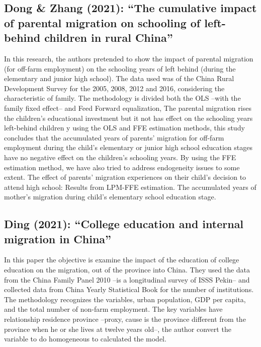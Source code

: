 \documentclass[11pt]{article}
\theoremstyle{prop}
\begin{document}
	\subsection{Dong \& Zhang (2021): ``The cumulative impact of parental migration on schooling of left-behind children in rural China''}
	In this research, the authors pretended to show the impact of parental migration (for off-farm employment) on the schooling years of left behind (during the elementary and junior high school). The data used was of the China Rural Development Survey for the 2005, 2008, 2012 and 2016, considering the characteristic of family. The methodology is divided both the OLS –with the family fixed effect– and Feed Forward equalization, 	
	The parental migration rises the children’s educational investment but it not has effect on the schooling years left-behind children y using the OLS and FFE estimation methods, this study concludes that the accumulated years of parents’ migration for off-farm employment during the child’s elementary or junior high school education stages have no negative effect on the children’s schooling years. By using the FFE estimation method, we have also tried to address endogeneity issues to some extent.
	The effect of parents’ migration experiences on their child’s decision to attend high school: Results from LPM-FFE estimation. %
	The accumulated years of mother’s migration during child’s elementary school education stage.
	
	\subsection{Ding (2021): ``College education and internal migration in China''}
	In this paper the objective is examine the impact of the education of college education on the migration, out of the province into China. They used the data from the China Family Panel 2010 –is a longitudinal survey of ISSS Pekin– and collected data from China Yearly Statistical Book for the number of institutions. The methodology recognizes the variables, urban population, GDP per capita, and the total number of non-farm employment. The key variables have relationship residence province –proxy, cause is the province different from the province when he or she lives at twelve years old–, the author convert the variable to do homogeneous to calculated the model.
	
\end{document}
